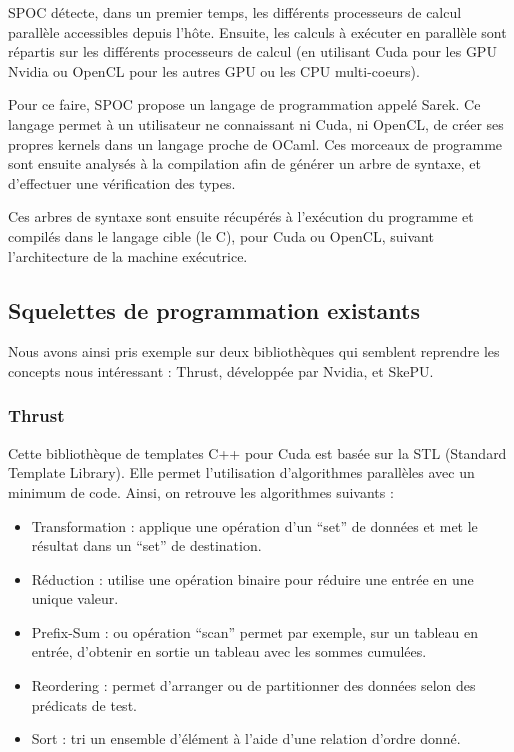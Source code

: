 \documentclass{report}
\begin{document}
SPOC détecte, dans un premier temps, les différents processeurs de calcul parallèle accessibles depuis l'hôte.\newline
Ensuite, les calculs à exécuter en parallèle sont répartis sur les différents processeurs de calcul (en utilisant Cuda pour les GPU Nvidia ou OpenCL pour les autres GPU ou les CPU multi-coeurs). \newline

Pour ce faire, SPOC propose un langage de programmation appelé Sarek. Ce langage permet à un utilisateur ne connaissant ni Cuda, ni OpenCL, de créer ses propres kernels dans un langage proche de OCaml. Ces morceaux de programme sont ensuite analysés à la compilation afin de générer un arbre de syntaxe, et d'effectuer une vérification des types.\newline

Ces arbres de syntaxe sont ensuite récupérés à l'exécution du programme et compilés dans le langage cible (le C), pour Cuda ou OpenCL, suivant l'architecture de la machine exécutrice. \newline

\subsection{Squelettes de programmation existants}

Nous avons ainsi pris exemple sur deux bibliothèques qui semblent reprendre les concepts nous intéressant : Thrust, développée par Nvidia, et SkePU.

\subsubsection{Thrust}

Cette bibliothèque de templates C++ pour Cuda est basée sur la STL (Standard Template Library). Elle permet l’utilisation d’algorithmes parallèles avec un minimum de code. Ainsi, on retrouve les algorithmes suivants :

\begin{itemize}
\item Transformation : applique une opération d’un “set” de données et met le résultat dans un “set” de destination. 
\item Réduction : utilise une opération binaire pour réduire une entrée en une unique valeur. 
\item Prefix-Sum : ou opération “scan” permet par exemple, sur un tableau en entrée, d’obtenir en sortie un tableau avec les sommes cumulées.
\item Reordering : permet d’arranger ou de partitionner des données selon des prédicats de test.
\item Sort : tri un ensemble d’élément à l’aide d’une relation d’ordre donné.
\end{itemize}
\end{document}
